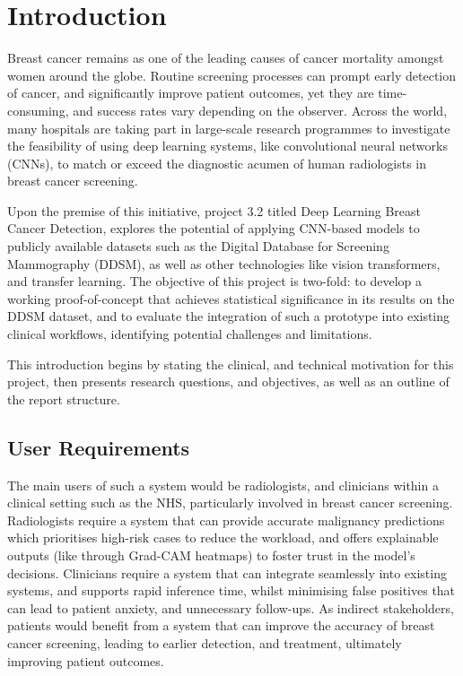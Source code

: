 \documentclass[main]{subfiles}
\begin{document}
\chapter{Introduction}
\label{chap:introduction}
Breast cancer remains as one of the leading causes of cancer mortality amongst women around the globe. Routine screening processes can prompt early detection of cancer, and significantly improve patient outcomes, yet they are time-consuming, and success rates vary depending on the observer. Across the world, many hospitals are taking part in large-scale research programmes to investigate the feasibility of using deep learning systems, like convolutional neural networks (CNNs), to match or exceed the diagnostic acumen of human radiologists in breast cancer screening.

Upon the premise of this initiative, project 3.2 titled \textemdash Deep Learning Breast Cancer Detection, explores the potential of applying CNN-based models to publicly available datasets such as the Digital Database for Screening Mammography (DDSM), as well as other technologies like vision transformers, and transfer learning. The objective of this project is two-fold: to develop a working proof-of-concept that achieves statistical significance in its results on the DDSM dataset, and to evaluate the integration of such a prototype into existing clinical workflows, identifying potential challenges and limitations.

This introduction begins by stating the clinical, and technical motivation for this project, then presents research questions, and objectives, as well as an outline of the report structure.

\section{User Requirements}
\label{sec:intro_user_requirements}
The main users of such a system would be radiologists, and clinicians within a clinical setting such as the NHS, particularly involved in breast cancer screening. Radiologists require a system that can provide accurate malignancy predictions which prioritises high-risk cases to reduce the workload, and offers explainable outputs (like through Grad-CAM heatmaps) to foster trust in the model's decisions. Clinicians require a system that can integrate seamlessly into existing systems, and supports rapid inference time, whilst minimising false positives that can lead to patient anxiety, and unnecessary follow-ups. As indirect stakeholders, patients would benefit from a system that can improve the accuracy of breast cancer screening, leading to earlier detection, and treatment, ultimately improving patient outcomes.
\end{document}
